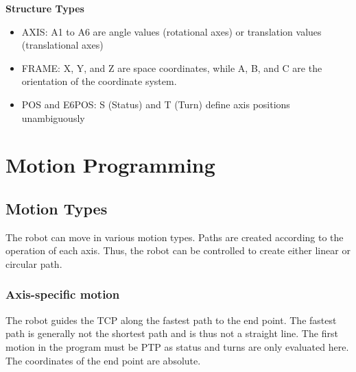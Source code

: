 \large {\textbf {Structure Types}}

\begin{itemize}

	\item AXIS: A1 to A6 are angle values (rotational axes) or translation values (translational axes)
		\vspace{.2cm}
		\newline
\vspace{.2cm}
	\item FRAME: X, Y, and Z are space coordinates, while A, B, and C are the orientation of the coordinate system.
		\vspace{.02cm}
	\newline

\newline

\item POS and E6POS:  S (Status) and T (Turn) define axis positions unambiguously
\vspace{.2cm}
\newline
\end{itemize}

\vspace{0.05cm}

	\section{Motion Programming}
\subsection{Motion Types}
The robot can move in various motion types. Paths are created according to the operation of each axis. Thus, the robot can be controlled to create either linear or circular path.
\subsubsection{Axis-specific motion}
	   The robot guides the TCP along the fastest path to the end point. The fastest path is generally not the shortest path and is thus not a straight line. The first motion in the program must be PTP as status and turns are only evaluated here.
	   The coordinates of the end point are absolute.
